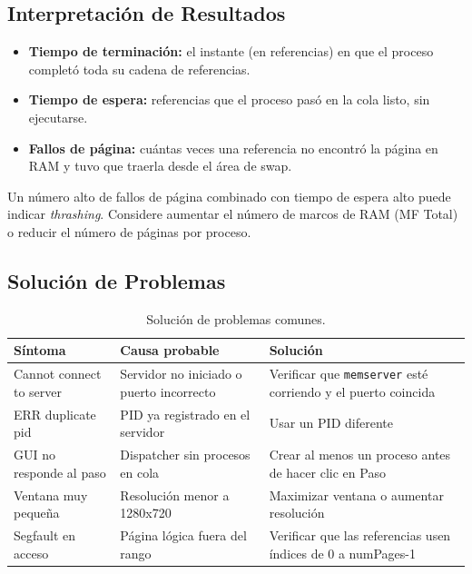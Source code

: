 \documentclass[12pt,letterpaper]{article}
\begin{document}
\subsection{Interpretación de Resultados}

\begin{tcolorbox}[infobox, title={Entendiendo las Métricas}]
\begin{itemize}
    \item \textbf{Tiempo de terminación:} el instante (en referencias) en que el proceso completó toda su cadena de referencias.
\item \textbf{Tiempo de espera:} referencias que el proceso pasó en la cola listo, sin ejecutarse.
\item \textbf{Fallos de página:} cuántas veces una referencia no encontró la página en RAM y tuvo que traerla desde el área de swap.
\end{itemize}
\end{tcolorbox}

\begin{tcolorbox}[alertbox, title={Cuidado con el Thrashing}]
Un número alto de fallos de página combinado con tiempo de espera alto puede indicar \textit{thrashing}.
Considere aumentar el número de marcos de RAM (MF Total) o reducir el número de páginas por proceso.
\end{tcolorbox}

\subsection{Solución de Problemas}

\begin{table}[H]
\centering
{}
\begin{tabular}{|p{3.2cm}|p{4.5cm}|p{7.5cm}|}
\hline
\rowcolor{catBlue!40}
\textbf{Síntoma} & \textbf{Causa probable} & \textbf{Solución} \\
\hline
Cannot connect to server & Servidor no iniciado o puerto incorrecto & Verificar que \texttt{memserver} esté corriendo y el puerto coincida \\
\hline
ERR duplicate pid & PID ya registrado en el servidor & Usar un PID diferente \\
\hline
GUI no responde al paso & Dispatcher sin procesos en cola & Crear al menos un proceso antes de hacer clic en Paso \\
\hline
Ventana muy pequeña & Resolución menor a 1280x720 & Maximizar ventana o aumentar resolución \\
\hline
Segfault en acceso & Página lógica fuera del rango & Verificar que las referencias usen índices de 0 a numPages-1 \\
\hline
\end{tabular}
\caption{Solución de problemas comunes.}
\end{table}
\end{document}
